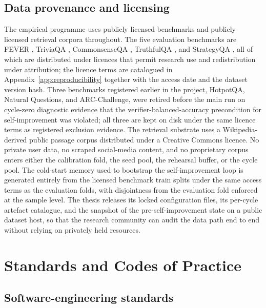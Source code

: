 \subsection{Data provenance and licensing}
\label{sec:ethics-provenance}

The empirical programme uses publicly licensed benchmarks and publicly licensed retrieval corpora throughout. The five evaluation benchmarks are FEVER \cite{thorne-etal-2018-fever}, TriviaQA \cite{joshi-etal-2017-triviaqa}, CommonsenseQA \cite{talmor-etal-2019-commonsenseqa}, TruthfulQA \cite{lin-etal-2022-truthfulqa}, and StrategyQA \cite{10.1162/tacl_a_00370}, all of which are distributed under licences that permit research use and redistribution under attribution; the licence terms are catalogued in Appendix~\ref{app:reproducibility} together with the access date and the dataset version hash. Three benchmarks registered earlier in the project, HotpotQA, Natural Questions, and ARC-Challenge, were retired before the main run on cycle-zero diagnostic evidence that the verifier-balanced-accuracy precondition for self-improvement was violated; all three are kept on disk under the same licence terms as registered exclusion evidence. The retrieval substrate uses a Wikipedia-derived public passage corpus distributed under a Creative Commons licence. No private user data, no scraped social-media content, and no proprietary corpus enters either the calibration fold, the seed pool, the rehearsal buffer, or the cycle pool. The cold-start memory used to bootstrap the self-improvement loop is generated entirely from the licensed benchmark train splits under the same access terms as the evaluation folds, with disjointness from the evaluation fold enforced at the sample level. The thesis releases its locked configuration files, its per-cycle artefact catalogue, and the snapshot of the pre-self-improvement state on a public dataset host, so that the research community can audit the data path end to end without relying on privately held resources.

\section{Standards and Codes of Practice}
\label{sec:standards}

\subsection{Software-engineering standards}
\label{sec:std-software}

